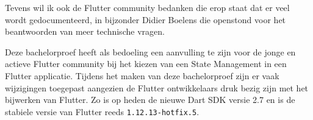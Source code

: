 Tevens wil ik ook de Flutter community bedanken die erop staat dat er veel wordt gedocumenteerd, in bijzonder Didier Boelens die openstond voor het beantwoorden van meer technische vragen.

Deze bachelorproef heeft als bedoeling een aanvulling te zijn voor de jonge en actieve Flutter community bij het kiezen van een State Management in een Flutter applicatie. Tijdens het maken van deze bachelorproef zijn er vaak wijzigingen toegepast aangezien de Flutter ontwikkelaars druk bezig zijn met het bijwerken van Flutter. Zo is op heden de nieuwe Dart SDK versie 2.7 en is de stabiele versie van Flutter reeds \verb|1.12.13-hotfix.5|.